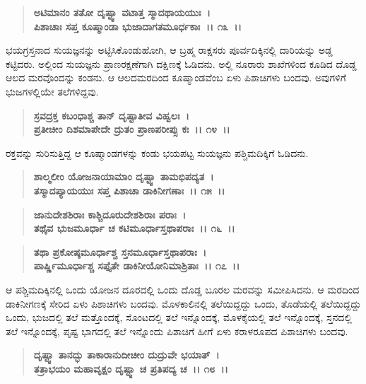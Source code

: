 \begin{verse}
\textbf{ಅಟಿಮಾನಂ ತತೋ ದೃಷ್ಟ್ವಾ ವಟಾತ್ತ ಸ್ಮಾದಥಾಯಯುಃ~।}\\\textbf{ಪಿಶಾಚಾಃ ಸಪ್ತ ಕೂಷ್ಮಾಂಡಾ ಭುಜಾದಾಗತಮೂರ್ಧಕಾಃ~।। ೧೩~।।}
\end{verse}

ಭಯಗ್ರಸ್ತನಾದ ಸುಯಜ್ಞನನ್ನು ಅಟ್ಟಿಸಿಕೊಂಡುಹೋಗಿ, ಆ ಬ್ರಹ್ಮ ರಾಕ್ಷಸರು ಪೂರ್ವದಿಕ್ಕಿನಲ್ಲಿ ದಾರಿಯನ್ನು ಅಡ್ಡ ಕಟ್ಟಿದರು. ಅಲ್ಲಿಂದ ಸುಯಜ್ಞನು ಪ್ರಾಣರಕ್ಷಣೆಗಾಗಿ ದಕ್ಷಿಣಕ್ಕೆ ಓಡಿದನು. ಅಲ್ಲಿ ನೂರಾರು ಶಾಖೆಗಳಿಂದ ಕೂಡಿದ ದೊಡ್ಡ ಆಲದ ಮರವೊಂದನ್ನು ಕಂಡನು. ಆ ಆಲದಮರದಿಂದ ಕೂಷ್ಮಾಂಡವೆಂಬ ಏಳು ಪಿಶಾಚಿಗಳು ಬಂದವು. ಅವುಗಳಿಗೆ ಭುಜಗಳಲ್ಲಿಯೇ ತಲೆಗಳಿದ್ದವು.

\begin{verse}
\textbf{ಸ್ರವದ್ರಕ್ತ ಕಬಂಧಾಶ್ಚ ತಾನ್ ದೃಷ್ಟಾತೀವ ವಿಹ್ವಲಃ~।}\\\textbf{ಪ್ರತೀಚೀಂ ದಿಶಮಾಪೇದೇ ದ್ರುತಂ ಪ್ರಾಣಪರೀಪ್ಸು ಕಃ~।। ೧೪~।।}
\end{verse}

ರಕ್ತವನ್ನು ಸುರಿಸುತ್ತಿದ್ದ ಆ ಕೂಷ್ಮಾಂಡಗಳನ್ನು ಕಂಡು ಭಯಪಟ್ಟ ಸುಯಜ್ಞನು ಪಶ್ಚಿಮದಿಕ್ಕಿಗೆ ಓಡಿದನು.

\begin{verse}
\textbf{ಶಾಲ್ಮಲೀಂ ಯೋಜನಾಯಾಮಾಂ ದೃಷ್ಟ್ವಾ ತಾಮಭಿಪದ್ಯತ~।}\\\textbf{ತಸ್ಮಾದಪ್ಯಾಯಯುಃ ಸಪ್ತ ಪಿಶಾಚಾ ಡಾಕಿನೀಗಣಾಃ~।। ೧೫~।। }
\end{verse}

\begin{verse}
\textbf{ಜಾನುದೇಶಶಿರಾಃ ಕಾಶ್ಚಿದೂರುದೇಶಶಿರಾಃ ಪರಾಃ~।}\\\textbf{ತಥೈವ ಭುಜಮೂರ್ಧಾ ಚ ಕಟಿಮೂರ್ಧಾಸ್ತಥಾಪರಾಃ~।। ೧೬~।।} 
\end{verse}

\begin{verse}
\textbf{ತಥಾ ಪ್ರಕೋಷ್ಠಮೂರ್ಧಾಶ್ಚ ಸ್ತನಮೂರ್ಧಾಸ್ತಥಾಪರಾಃ~।}\\\textbf{ಪಾರ್ಷ್ಣಿಮೂರ್ಧಾಶ್ಚ ಸಪ್ತೈತೇ ಡಾಕಿನೀಯೋನಿಮಾಶ್ರಿತಾಃ~।। ೧೭~।।}
\end{verse}

ಆ ಪಶ್ಚಿಮದಿಕ್ಕಿನಲ್ಲಿ ಒಂದು ಯೋಜನ ದೂರದಲ್ಲಿ ಒಂದು ದೊಡ್ಡ ಬೂರಲ ಮರವನ್ನು ಸಮೀಪಿಸಿದನು. ಆ ಮರದಿಂದ ಡಾಕಿನೀಗಣಕ್ಕೆ ಸೇರಿದ ಏಳು ಪಿಶಾಚಿಗಳು ಬಂದವು. ಮೊಳಕಾಲಿನಲ್ಲಿ ತಲೆಯಿದ್ದದ್ದು ಒಂದು, ತೊಡೆಯಲ್ಲಿ ತಲೆಯಿದ್ದದ್ದು ಒಂದು, ಭುಜದಲ್ಲಿ ತಲೆ ಮತ್ತೊಂದಕ್ಕೆ, ಸೊಂಟದಲ್ಲಿ ತಲೆ ಇನ್ನೊಂದಕ್ಕೆ, ಮೊಳಕೈಯಲ್ಲಿ ತಲೆ ಇನ್ನೊಂದಕ್ಕೆ, ಸ್ತನದಲ್ಲಿ ತಲೆ ಇನ್ನೊಂದಕ್ಕೆ, ಪೃಷ್ಟ ಭಾಗದಲ್ಲಿ ತಲೆ ಇನ್ನೊಂದು ಪಿಶಾಚಿಗೆ ಹೀಗೆ ಏಳು ಕರಾಳರೂಪದ ಪಿಶಾಚಿಗಳು ಬಂದವು.

\begin{verse}
\textbf{ದೃಷ್ಟ್ವಾ ತಾನದ್ಭು ತಾಕಾರಾನುದೀಚೀಂ ದುದ್ರುವೇ ಭಯಾತ್~।}\\\textbf{ತತ್ರಾಭಯಂ ಮಹಾವೃಕ್ಷಂ ದೃಷ್ಟ್ವಾ ಚ ಪ್ರತಿಪದ್ಯ ಚ~।। ೧೮~।।} 
\end{verse}

